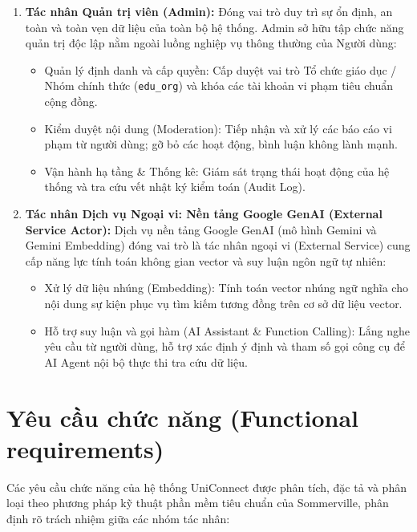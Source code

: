 \begin{enumerate}
    \item \textbf{Tác nhân Quản trị viên (Admin):}
    Đóng vai trò duy trì sự ổn định, an toàn và toàn vẹn dữ liệu của toàn bộ hệ thống. Admin sở hữu tập chức năng quản trị độc lập nằm ngoài luồng nghiệp vụ thông thường của Người dùng:
    \begin{itemize}
        \item Quản lý định danh và cấp quyền: Cấp duyệt vai trò Tổ chức giáo dục / Nhóm chính thức (\texttt{edu\_org}) và khóa các tài khoản vi phạm tiêu chuẩn cộng đồng.

        \item Kiểm duyệt nội dung (Moderation): Tiếp nhận và xử lý các báo cáo vi phạm từ người dùng; gỡ bỏ các hoạt động, bình luận không lành mạnh.
        
        \item Vận hành hạ tầng \& Thống kê: Giám sát trạng thái hoạt động của hệ thống và tra cứu vết nhật ký kiểm toán (Audit Log).
    \end{itemize}

    \item \textbf{Tác nhân Dịch vụ Ngoại vi: Nền tảng Google GenAI (External Service Actor):}
    Dịch vụ nền tảng Google GenAI (mô hình Gemini và Gemini Embedding) đóng vai trò là tác nhân ngoại vi (External Service) cung cấp năng lực tính toán không gian vector và suy luận ngôn ngữ tự nhiên:
    \begin{itemize}
        \item Xử lý dữ liệu nhúng (Embedding): Tính toán vector nhúng ngữ nghĩa cho nội dung sự kiện phục vụ tìm kiếm tương đồng trên cơ sở dữ liệu vector.

        \item Hỗ trợ suy luận và gọi hàm (AI Assistant \& Function Calling): Lắng nghe yêu cầu từ người dùng, hỗ trợ xác định ý định và tham số gọi công cụ để AI Agent nội bộ thực thi tra cứu dữ liệu.
    \end{itemize}
\end{enumerate}

\section{Yêu cầu chức năng (Functional requirements)}

Các yêu cầu chức năng của hệ thống UniConnect được phân tích, đặc tả và phân loại theo phương pháp kỹ thuật phần mềm tiêu chuẩn của Sommerville\cite{sommerville2015software}, phân định rõ trách nhiệm giữa các nhóm tác nhân:


